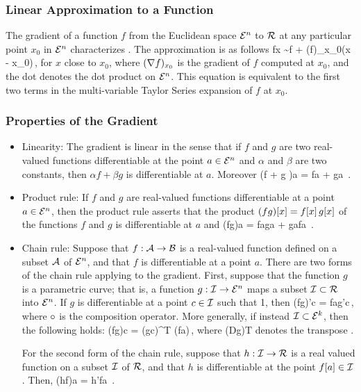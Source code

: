 \subsubsection{Linear Approximation to a Function}
The gradient of a function $f$ from the Euclidean space $\mathcal{E}^{n}$ to $\mathcal{R}$ at any particular point $x_0$ in $\mathcal{E}^{n}$ characterizes . The approximation is as follows
\beq
f\vat x \sim f + \left(\gder f\right)_{x_0}\iprod \left(x - x_0\right)\,,
\eeq
for $x$ close to $x_0$, where $(\nabla f)_{x_0}$ is the gradient of $f$ computed at $x_0$, and the dot denotes the dot product on $\mathcal{E}^{n}$. This equation is equivalent to the first two terms in the multi-variable Taylor Series expansion of $f$ at $x_0$.


\subsubsection{Properties of the Gradient}
\begin{itemize}
\item Linearity: The gradient is linear in the sense that if $f$ and $g$ are two real-valued functions differentiable at the point $a\in\mathcal{E}^{n}$ and $\alpha$ and $\beta$ are two constants, then $\alpha f + \beta g$ is differentiable at $a$. Moreover
\beq
\gder\left(\alpha f + \beta g \right)\vat a = \alpha\gder f\vat a + \beta\gder g\vat a \,.
\eeq
%
\item Product rule: If $f$ and $g$ are real-valued functions differentiable at a point $a\in\mathcal{E}^{n}$, then the product rule asserts that the product $(fg)\!\left[{x}\right] = f\!\left[{x}\right] g\!\left[{x}\right]$ of the functions $f$ and $g$ is differentiable at $a$ and
\beq
\gder(fg)\vat a = f\vat a\gder g\vat a + g\vat a\gder f\vat a \,.
\eeq
%
\item Chain rule: Suppose that ${f}:{\mathcal{A}}\to{\mathcal{B}}$ is a real-valued function defined on a subset $\mathcal{A}$ of $\mathcal{E}^{n}$, and that $f$ is differentiable at a point $a$. There are two forms of the chain rule applying to the gradient. First, suppose that the function $g$ is a parametric curve; that is, a function ${g}:{\mathcal{I}}\to{\mathcal{E}^{n}}$ maps a subset $\mathcal{I}\subset\mathcal{R}$ into $\mathcal{E}^{n}$. If $g$ is differentiable at a point $c\in\mathcal{I}$ such that {{{1}}}, then
\beq
(f\fcomp g)'\vat c = \gder f\vat a\iprod g'\vat c\,,
\eeq
where $\operatorname{\circ}$ is the composition operator. More generally, if instead $\mathcal{I}\subset\mathcal{E}^{k}$, then the following holds:
\beq
\gder(f\fcomp g)\vat c = (\fder g\vat c)^T (\gder f\vat a)\,,
\eeq
where (Dg)T denotes the transpose .

For the second form of the chain rule, suppose that ${h}:{\mathcal{I}}\to{\mathcal{R}}$ is a real valued function on a subset $\mathcal{I}$ of $\mathcal{R}$, and that $h$ is differentiable at the point $f\!\left[{a}\right]\in\mathcal{I}$. Then,
\beq
\gder(h\fcomp f)\vat a = h'\gder f\vat a \,.
\eeq
%
\end{itemize}


